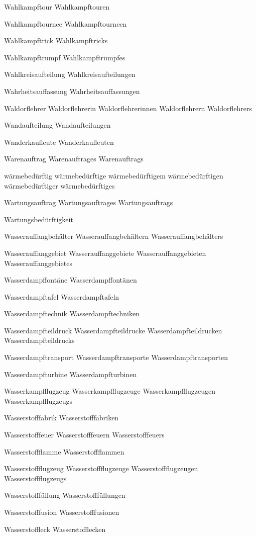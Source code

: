 Wahlkampftour
Wahlkampftouren

Wahlkampftournee
Wahlkampftourneen

Wahlkampftrick
Wahlkampftricks

Wahlkampftrumpf
Wahlkampftrumpfes

Wahlkreisaufteilung
Wahlkreisaufteilungen

Wahrheitsauffassung
Wahrheitsauffassungen

Waldorflehrer
Waldorflehrerin
Waldorflehrerinnen
Waldorflehrern
Waldorflehrers

Wandaufteilung
Wandaufteilungen

Wanderkaufleute
Wanderkaufleuten

Warenauftrag
Warenauftrages
Warenauftrags

wärmebedürftig
wärmebedürftige
wärmebedürftigem
wärmebedürftigen
wärmebedürftiger
wärmebedürftiges

Wartungsauftrag
Wartungsauftrages
Wartungsauftrags

Wartungsbedürftigkeit

Wasserauffangbehälter
Wasserauffangbehältern
Wasserauffangbehälters

Wasserauffanggebiet
Wasserauffanggebiete
Wasserauffanggebieten
Wasserauffanggebietes

Wasserdampffontäne
Wasserdampffontänen

Wasserdampftafel
Wasserdampftafeln

Wasserdampftechnik
Wasserdampftechniken

Wasserdampfteildruck
Wasserdampfteildrucke
Wasserdampfteildrucken
Wasserdampfteildrucks

Wasserdampftransport
Wasserdampftransporte
Wasserdampftransporten

Wasserdampfturbine
Wasserdampfturbinen

Wasserkampfflugzeug
Wasserkampfflugzeuge
Wasserkampfflugzeugen
Wasserkampfflugzeugs

Wasserstofffabrik
Wasserstofffabriken

Wasserstofffeuer
Wasserstofffeuern
Wasserstofffeuers

Wasserstoffflamme
Wasserstoffflammen

Wasserstoffflugzeug
Wasserstoffflugzeuge
Wasserstoffflugzeugen
Wasserstoffflugzeugs

Wasserstofffüllung
Wasserstofffüllungen

Wasserstofffusion
Wasserstofffusionen

Wasserstoffleck
Wasserstofflecken

